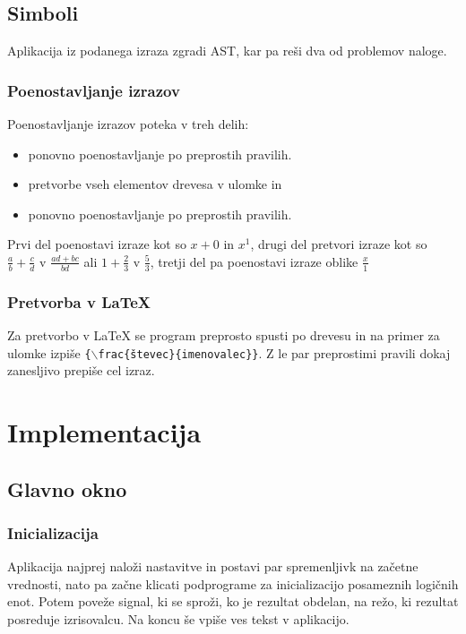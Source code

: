\documentclass[12pt,titlepage]{report}
\begin{document}
	\section{Simboli}
	\label{symbol}
		Aplikacija iz podanega izraza zgradi AST, kar pa reši dva od problemov naloge.
			\subsection{Poenostavljanje izrazov}
				Poenostavljanje izrazov poteka v treh delih:
				\begin{itemize}
					\item ponovno poenostavljanje po preprostih pravilih.
					\item pretvorbe vseh elementov drevesa v ulomke in
					\item ponovno poenostavljanje po preprostih pravilih.
				\end{itemize}
				Prvi del poenostavi izraze kot so $ x + 0 $ in $ x^1 $, drugi del pretvori izraze kot so $ \frac{a}{b} + \frac{c}{d} $ v $ \frac{ad + bc}{bd} $ ali $ 1 + \frac{2}{3} $ v $ \frac{5}{3} $, tretji del pa poenostavi izraze oblike $ \frac{x}{1} $
			\subsection{Pretvorba v \LaTeX{}}
				Za pretvorbo v \LaTeX{} se program preprosto spusti po drevesu in na primer za ulomke izpiše \texttt{\{$\backslash$frac\{števec\}\{imenovalec\}\}}. Z le par preprostimi pravili dokaj zanesljivo prepiše cel izraz.
				
\chapter{Implementacija}
\label{impl}
	\section{Glavno okno}
	\label{mainwindow_impl}
		\subsection{Inicializacija}
		\label{constructor}
			Aplikacija najprej naloži nastavitve in postavi par spremenljivk na začetne vrednosti, nato pa začne klicati podprograme za inicializacijo posameznih logičnih enot. %
			Potem poveže signal, ki se sproži, ko je rezultat obdelan, na režo, ki rezultat posreduje izrisovalcu.
			Na koncu še vpiše ves tekst v aplikacijo.
			
\end{document}
